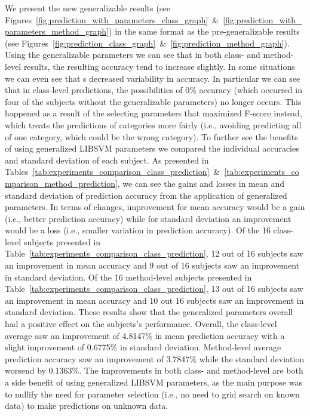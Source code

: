 We present the new generalizable results (see Figures~\ref{fig:prediction_with_parameters_class_graph}~\&~\ref{fig:prediction_with_parameters_method_graph}) in the same format as the pre-generalizable results (see Figures~\ref{fig:prediction_class_graph}~\&~\ref{fig:prediction_method_graph}). Using the generalizable parameters we can see that in both class- and method-level results, the resulting accuracy tend to increase slightly. In some situations we can even see that s decreased variability in accuracy. In particular we can see that in class-level predictions, the possibilities of 0\% accuracy (which occurred in four of the subjects without the generalizable parameters) no longer occurs. This happened as a result of the selecting parameters that maximized F-score instead, which treats the predictions of categories more fairly (i.e., avoiding predicting all of one category, which could be the wrong category). To further see the benefits of using generalized LIBSVM parameters we compared the individual accuracies and standard deviation of each subject. As presented in Tables~\ref{tab:experiments_comparison_class_prediction}~\&~\ref{tab:experiments_comparison_method_prediction}, we can see the gains and losses in mean and standard deviation of prediction accuracy from the application of generalized parameters. In terms of changes, improvement for mean accuracy would be a gain (i.e., better prediction accuracy) while for standard deviation an improvement would be a loss (i.e., smaller variation in prediction accuracy). Of the 16 class-level subjects presented in Table~\ref{tab:experiments_comparison_class_prediction}, 12 out of 16 subjects saw an improvement in mean accuracy and 9 out of 16 subjects saw an improvement in standard deviation. Of the 16 method-level subjects presented in Table~\ref{tab:experiments_comparison_class_prediction}, 13 out of 16 subjects saw an improvement in mean accuracy and 10 out 16 subjects saw an improvement in standard deviation. These results show that the generalized parameters overall had a positive effect on the subjects's performance. Overall, the class-level average saw an improvement of 4.8147\% in mean prediction accuracy with a slight improvement of 0.6775\% in standard deviation. Method-level average prediction accuracy saw an improvement of 3.7847\% while the standard deviation worsend by 0.1363\%. The improvements in both class- and method-level are both a side benefit of using generalized LIBSVM parameters, as the main purpose was to nullify the need for parameter selection (i.e., no need to grid search on known data) to make predictions on unknown data.

